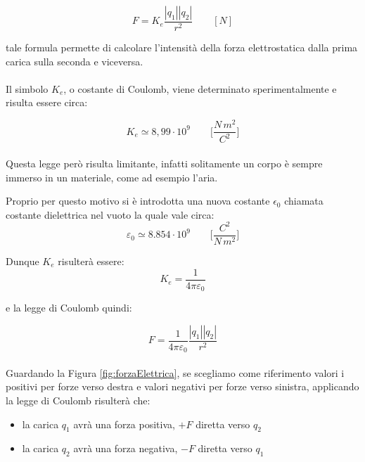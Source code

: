 \begin{equation}
    F = K_e\frac{|q_1||q_2|}{r^2} \qquad[N]
\end{equation}

tale formula permette di calcolare l'intensità della forza elettrostatica dalla prima carica sulla seconda e viceversa.
\paragraph{}
Il simbolo $K_e$, o costante di Coulomb, viene determinato sperimentalmente e risulta essere circa:

\begin{equation}
    K_e \simeq 8,99\cdot10^{9}\qquad \biggl[\frac{N\,m^2}{C^2}\biggl]
\end{equation}

\paragraph{}
Questa legge però risulta limitante, infatti solitamente un corpo è sempre immerso in un materiale, come ad esempio l'aria.

Proprio per questo motivo si è introdotta una nuova costante $\epsilon_0$ chiamata costante dielettrica nel vuoto la quale vale circa: 
 \begin{equation}
    \varepsilon_0 \simeq 8.854\cdot10^{9}\qquad \biggl[\frac{C^2}{N\,m^2}\biggl]
\end{equation}

Dunque $K_e$ risulterà essere:
 \begin{equation}
    K_e = \frac{1}{4\pi\varepsilon_0}
    \label{keFrazioneEpsilon}
\end{equation}

e la legge di Coulomb quindi:

\begin{equation}
    F = \frac{1}{4\pi\varepsilon_0}\frac{|q_1||q_2|}{r^2}
\end{equation}

\paragraph{}
Guardando la Figura \ref{fig:forzaElettrica}, se scegliamo come riferimento valori i positivi per forze verso destra e valori negativi per forze verso sinistra, applicando la legge di Coulomb risulterà che:

\begin{itemize}
    \item la carica $q_1$ avrà una forza positiva, $+F$ diretta verso $q_2$
    \item la carica $q_2$ avrà una forza negativa, $-F$ diretta verso $q_1$
\end{itemize}


